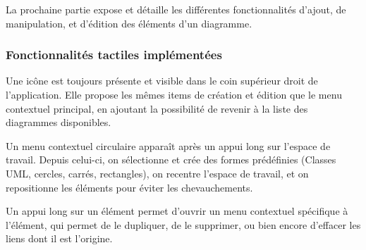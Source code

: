 La prochaine partie expose et détaille les différentes fonctionnalités d'ajout, de manipulation, et d'édition des éléments d'un diagramme.
	
\newpage
\subsubsection{Fonctionnalités tactiles implémentées}
Une icône est toujours présente et visible dans le coin supérieur droit de l'application. Elle propose les mêmes items de création et édition que le menu contextuel principal, en ajoutant la possibilité de revenir à la liste des diagrammes disponibles.

Un menu contextuel circulaire apparaît après un appui long sur l'espace de travail. Depuis celui-ci, on sélectionne et crée des formes prédéfinies (Classes UML, cercles, carrés, rectangles), on recentre l'espace de travail, et on repositionne les éléments pour éviter les chevauchements.

Un appui long sur un élément permet d'ouvrir un menu contextuel spécifique à l'élément, qui permet de le dupliquer, de le supprimer, ou bien encore d'effacer les liens dont il est l'origine.

